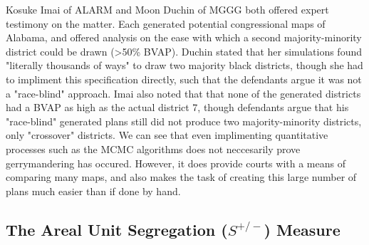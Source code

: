\documentclass{article}
\begin{document}
\par
Kosuke Imai of ALARM and Moon Duchin of MGGG both offered expert testimony on the matter. Each generated potential congressional maps of Alabama, and offered analysis on the ease with which a second majority-minority district could be drawn (>50\% BVAP). Duchin stated that her simulations found "literally thousands of ways" to draw two majority black districts, though she had to impliment this specification directly, such that the defendants argue it was not a "race-blind" approach. Imai also noted that that none of the generated districts had a BVAP as high as the actual district 7, though defendants argue that his "race-blind" generated plans still did not produce two majority-minority districts, only "crossover" districts. We can see that even implimenting quantitative processes such as the MCMC algorithms does not neccesarily prove gerrymandering has occured. However, it does provide courts with a means of comparing many maps, and also makes the task of creating this large number of plans much easier than if done by hand.
 
\subsection{The Areal Unit Segregation ($S^{+/-}$) Measure}\label{AUS}
\end{document}
